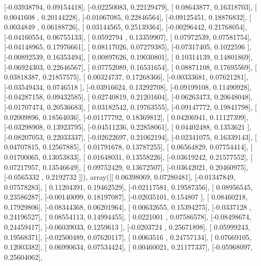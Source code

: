 \documentclass{article}
\begin{document}
       [-0.03938794,  0.09154418],
       [-0.02250083,  0.22129479],
       [ 0.08643877,  0.16318703],
       [ 0.0041608 ,  0.20144228],
       [-0.01067085,  0.22846564],
       [-0.09125451,  0.18876832],
       [ 0.0034849 ,  0.06188726],
       [ 0.03144565,  0.25139364],
       [-0.00296442,  0.21768054],
       [-0.04160554,  0.06755133],
       [ 0.0592794 ,  0.13359907],
       [ 0.07972539,  0.07581754],
       [-0.04148965,  0.17976661],
       [ 0.08117026,  0.07279385],
       [-0.07317405,  0.1022596 ],
       [-0.00892539,  0.16353494],
       [ 0.00897626,  0.19030801],
       [ 0.10314139,  0.14801869],
       [-0.06924303,  0.22646567],
       [ 0.07752089,  0.16531654],
       [ 0.08871108,  0.17695569],
       [ 0.03818387,  0.21857575],
       [ 0.00324737,  0.17268366],
       [-0.00333681,  0.07621281],
       [-0.03549434,  0.0746518 ],
       [-0.03916624,  0.13292708],
       [-0.09199108,  0.11490928],
       [-0.04287158,  0.09432585],
       [ 0.02740819,  0.21201604],
       [-0.06263473,  0.20648048],
       [-0.01707474,  0.20536683],
       [ 0.03182542,  0.19763555],
       [-0.09147772,  0.19841798],
       [ 0.02009896,  0.18564036],
       [-0.01177792,  0.18369812],
       [ 0.04206941,  0.11127399],
       [-0.03298908,  0.13923795],
       [-0.04511236,  0.22858061],
       [ 0.04402488,  0.1353621 ],
       [-0.08207053,  0.22033337],
       [-0.02622697,  0.21062194],
       [-0.02341075,  0.16339143],
       [ 0.04707815,  0.12567885],
       [ 0.01791678,  0.13787255],
       [ 0.06564829,  0.07754414],
       [ 0.01700065,  0.13053833],
       [ 0.01648031,  0.13558226],
       [-0.03619242,  0.21577552],
       [ 0.07217957,  0.13546649],
       [ 0.09752429,  0.13672507],
       [-0.03642021,  0.20460975],
       [-0.0565332 ,  0.2192732 ]]), array([[ 0.06398069,  0.07280481],
       [-0.01347849,  0.07578283],
       [ 0.11204391,  0.19462529],
       [-0.02117581,  0.19587356],
       [ 0.08956545,  0.23586287],
       [-0.00140099,  0.18197087],
       [-0.02035101,  0.154807  ],
       [ 0.08460218,  0.17929806],
       [-0.08344368,  0.06201964],
       [ 0.00632655,  0.15394275],
       [-0.0337128 ,  0.24196527],
       [ 0.08554113,  0.14994455],
       [ 0.0221001 ,  0.07586578],
       [-0.08498674,  0.24459417],
       [-0.06039033,  0.1259613 ],
       [-0.0203724 ,  0.25671898],
       [ 0.05999243,  0.19568371],
       [-0.02500489,  0.07620117],
       [ 0.0063516 ,  0.24757134],
       [ 0.07669105,  0.12003382],
       [ 0.06990634,  0.07534424],
       [ 0.00460021,  0.21177337],
       [-0.05968097,  0.25604062],
\end{document}
